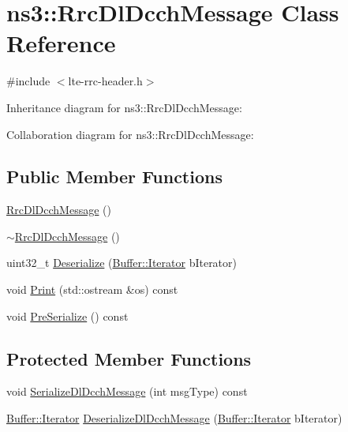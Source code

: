 \hypertarget{classns3_1_1RrcDlDcchMessage}{}\section{ns3\+:\+:Rrc\+Dl\+Dcch\+Message Class Reference}
\label{classns3_1_1RrcDlDcchMessage}


{\ttfamily \#include $<$lte-\/rrc-\/header.\+h$>$}



Inheritance diagram for ns3\+:\+:Rrc\+Dl\+Dcch\+Message\+:


Collaboration diagram for ns3\+:\+:Rrc\+Dl\+Dcch\+Message\+:
\subsection*{Public Member Functions}
\begin{DoxyCompactItemize}
\item 
\hyperlink{classns3_1_1RrcDlDcchMessage_ab2ba4ce6c9f0f96c28e2606461f9b6a9}{Rrc\+Dl\+Dcch\+Message} ()
\item 
\hyperlink{classns3_1_1RrcDlDcchMessage_aabcb05168982f4ab92a093d02c3ad8ca}{$\sim$\+Rrc\+Dl\+Dcch\+Message} ()
\item 
uint32\+\_\+t \hyperlink{classns3_1_1RrcDlDcchMessage_a656baac96990031053ce3fb4f1ec596a}{Deserialize} (\hyperlink{classns3_1_1Buffer_1_1Iterator}{Buffer\+::\+Iterator} b\+Iterator)
\item 
void \hyperlink{classns3_1_1RrcDlDcchMessage_a6d7d6a669036d5637c30361a2ea88a0c}{Print} (std\+::ostream \&os) const 
\item 
void \hyperlink{classns3_1_1RrcDlDcchMessage_aa07e7a274667fd50ebc35a8d1c9062d7}{Pre\+Serialize} () const 
\end{DoxyCompactItemize}
\subsection*{Protected Member Functions}
\begin{DoxyCompactItemize}
\item 
void \hyperlink{classns3_1_1RrcDlDcchMessage_ae489863869038874910c89a7b54758cd}{Serialize\+Dl\+Dcch\+Message} (int msg\+Type) const 
\item 
\hyperlink{classns3_1_1Buffer_1_1Iterator}{Buffer\+::\+Iterator} \hyperlink{classns3_1_1RrcDlDcchMessage_afa8618901d8be7727b6a579a246055b2}{Deserialize\+Dl\+Dcch\+Message} (\hyperlink{classns3_1_1Buffer_1_1Iterator}{Buffer\+::\+Iterator} b\+Iterator)
\end{DoxyCompactItemize}
